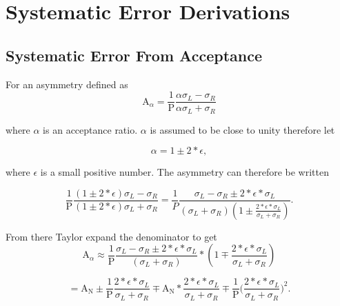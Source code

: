 \chapter{Systematic Error Derivations}
\ifpdf
\graphicspath{{Chapters/Appendix/Figs/Raster/}{Chapters/Appendix/Figs/PDF/}{Chapters/Appendix/Figs/}}
\else \graphicspath{{Chapters/Appendix/Figs/Vector/}{Chapters/Appendix/Figs/}}
\fi

\section{Systematic Error From Acceptance} \label{app::sysAcc}

For an asymmetry defined as
\begin{equation}
  \mathrm{A}_{\alpha} =
  \frac{1}{\mathrm{P}}
  \frac{\alpha\sigma_L - \sigma_R}{\alpha\sigma_L + \sigma_R} 
\end{equation}

\noindent
where $\alpha$ is an acceptance ratio.  $\alpha$ is assumed to be close to unity
therefore let

\begin{equation}
  \alpha = 1 \pm 2*\epsilon,
\end{equation}

\noindent
where $\epsilon$ is a small positive number.  The asymmetry can
therefore be written

\begin{equation}
  \frac{1}{\mathrm{P}}
  \frac{(1\pm2*\epsilon)\sigma_L -
    \sigma_R}{(1\pm2*\epsilon)\sigma_L + \sigma_R} = \frac{1}{P} \frac{\sigma_L
    - \sigma_R \pm 2*\epsilon * \sigma_L}{ (\sigma_L +
    \sigma_R)(1\pm\frac{2*\epsilon *\sigma_L}{\sigma_L + \sigma_R}) }.
\end{equation}

\noindent
From there Taylor expand the denominator to get
\begin{equation}
  \mathrm{A}_{\alpha} \approx
  \frac{1}{\mathrm{P}}
  \frac{\sigma_L - \sigma_R \pm
    2*\epsilon * \sigma_L}{ (\sigma_L + \sigma_R)} *(1\mp\frac{2*\epsilon
    *\sigma_L}{\sigma_L + \sigma_R})
\end{equation}

\begin{equation*}
  = 
  \mathrm{A}_{\mathrm{N}}
  \pm \frac{1}{\mathrm{P}} \frac{2*\epsilon *\sigma_L}{\sigma_L + \sigma_R}
  \mp \mathrm{A}_{\mathrm{N}}* \frac{2*\epsilon *\sigma_L}{\sigma_L + \sigma_R}
  \mp \frac{1}{\mathrm{P}}
  \Big( \frac{2*\epsilon *\sigma_L}{\sigma_L + \sigma_R} \Big )^2.
\end{equation*}

